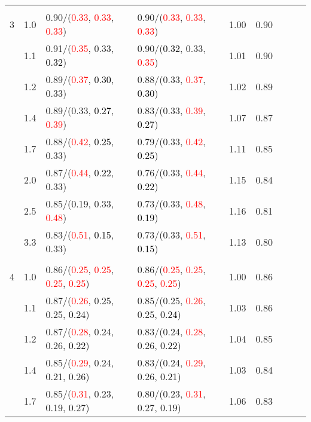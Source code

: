 \documentclass[10pt,a4paper]{report}
\begin{document}
\begin{table}[!htbp]
\begin{center}
{\begin{tabular}{ccllccccc}
			&&&&\\
			3			&1.0&0.90/(\textcolor{red}{0.33}, \textcolor{red}{0.33}, \textcolor{red}{0.33})&0.90/(\textcolor{red}{0.33}, \textcolor{red}{0.33}, \textcolor{red}{0.33})&1.00&0.90\\
			&1.1&0.91/(\textcolor{red}{0.35}, 0.33, \textcolor{black}{0.32})&0.90/(\textcolor{black}{0.32}, 0.33, \textcolor{red}{0.35})&1.01&0.90\\
			&1.2&0.89/(\textcolor{red}{0.37}, \textcolor{black}{0.30}, 0.33)&0.88/(0.33, \textcolor{red}{0.37}, \textcolor{black}{0.30})&1.02&0.89\\
			&1.4&0.89/(0.33, \textcolor{black}{0.27}, \textcolor{red}{0.39})&0.83/(0.33, \textcolor{red}{0.39}, \textcolor{black}{0.27})&1.07&0.87\\
			&1.7&0.88/(\textcolor{red}{0.42}, \textcolor{black}{0.25}, 0.33)&0.79/(0.33, \textcolor{red}{0.42}, \textcolor{black}{0.25})&1.11&0.85\\
			&2.0&0.87/(\textcolor{red}{0.44}, \textcolor{black}{0.22}, 0.33)&0.76/(0.33, \textcolor{red}{0.44}, \textcolor{black}{0.22})&1.15&0.84\\
			&2.5&0.85/(\textcolor{black}{0.19}, 0.33, \textcolor{red}{0.48})&0.73/(0.33, \textcolor{red}{0.48}, \textcolor{black}{0.19})&1.16&0.81\\
			&3.3&0.83/(\textcolor{red}{0.51}, \textcolor{black}{0.15}, 0.33)&0.73/(0.33, \textcolor{red}{0.51}, \textcolor{black}{0.15})&1.13&0.80\\
			&&&&\\
			4			&1.0&0.86/(\textcolor{red}{0.25}, \textcolor{red}{0.25}, \textcolor{red}{0.25}, \textcolor{red}{0.25})&0.86/(\textcolor{red}{0.25}, \textcolor{red}{0.25}, \textcolor{red}{0.25}, \textcolor{red}{0.25})&1.00&0.86\\
			&1.1&0.87/(\textcolor{red}{0.26}, 0.25, 0.25, \textcolor{black}{0.24})&0.85/(0.25, \textcolor{red}{0.26}, 0.25, \textcolor{black}{0.24})&1.03&0.86\\
			&1.2&0.87/(\textcolor{red}{0.28}, 0.24, 0.26, \textcolor{black}{0.22})&0.83/(0.24, \textcolor{red}{0.28}, 0.26, \textcolor{black}{0.22})&1.04&0.85\\
			&1.4&0.85/(\textcolor{red}{0.29}, 0.24, \textcolor{black}{0.21}, 0.26)&0.83/(0.24, \textcolor{red}{0.29}, 0.26, \textcolor{black}{0.21})&1.03&0.84\\
			&1.7&0.85/(\textcolor{red}{0.31}, 0.23, \textcolor{black}{0.19}, 0.27)&0.80/(0.23, \textcolor{red}{0.31}, 0.27, \textcolor{black}{0.19})&1.06&0.83\\

\end{tabular}}
\end{center}
\end{table}
\end{document}
